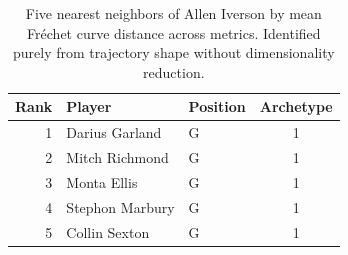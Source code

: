 \begin{table}[htbp]
  \centering\small
  \begin{tabular}{rllc}
    \toprule
    Rank & Player & Position & Archetype \\
    \midrule
    1 & Darius Garland & G & 1 \\
    2 & Mitch Richmond & G & 1 \\
    3 & Monta Ellis & G & 1 \\
    4 & Stephon Marbury & G & 1 \\
    5 & Collin Sexton & G & 1 \\
    \bottomrule
  \end{tabular}
  \caption{Five nearest neighbors of Allen Iverson by mean Fr\'{e}chet curve distance across metrics. Identified purely from trajectory shape without dimensionality reduction.}
  \label{tab:Allen_Iverson_frechet_curve_neighbors}
\end{table}

